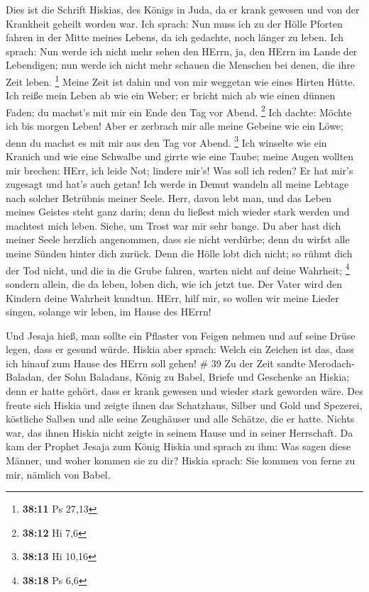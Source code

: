  Dies ist die Schrift Hiskias, des Königs in Juda, da er
krank gewesen und von der Krankheit geheilt worden war. 
Ich sprach: Nun muss ich zu der Hölle Pforten fahren in der Mitte meines
Lebens, da ich gedachte, noch länger zu leben.  Ich sprach:
Nun werde ich nicht mehr sehen den HErrn, ja, den HErrn im Lande der
Lebendigen; nun werde ich nicht mehr schauen die Menschen bei denen, die
ihre Zeit leben. \footnote{\textbf{38:11} Ps 27,13}  Meine
Zeit ist dahin und von mir weggetan wie eines Hirten Hütte. Ich reiße
mein Leben ab wie ein Weber; er bricht mich ab wie einen dünnen Faden;
du machst's mit mir ein Ende den Tag vor Abend. \footnote{\textbf{38:12}
  Hi 7,6}  Ich dachte: Möchte ich bis morgen Leben! Aber er
zerbrach mir alle meine Gebeine wie ein Löwe; denn du machst es mit mir
aus den Tag vor Abend. \footnote{\textbf{38:13} Hi 10,16} 
Ich winselte wie ein Kranich und wie eine Schwalbe und girrte wie eine
Taube; meine Augen wollten mir brechen: HErr, ich leide Not; lindere
mir's!  Was soll ich reden? Er hat mir's zugesagt und hat's
auch getan! Ich werde in Demut wandeln all meine Lebtage nach solcher
Betrübnis meiner Seele.  Herr, davon lebt man, und das
Leben meines Geistes steht ganz darin; denn du ließest mich wieder stark
werden und machtest mich leben.  Siehe, um Trost war mir
sehr bange. Du aber hast dich meiner Seele herzlich angenommen, dass sie
nicht verdürbe; denn du wirfst alle meine Sünden hinter dich zurück.
 Denn die Hölle lobt dich nicht; so rühmt dich der Tod
nicht, und die in die Grube fahren, warten nicht auf deine Wahrheit;
\footnote{\textbf{38:18} Ps 6,6}  sondern allein, die da
leben, loben dich, wie ich jetzt tue. Der Vater wird den Kindern deine
Wahrheit kundtun.  HErr, hilf mir, so wollen wir meine
Lieder singen, solange wir leben, im Hause des HErrn!

 Und Jesaja hieß, man sollte ein Pflaster von Feigen nehmen
und auf seine Drüse legen, dass er gesund würde.  Hiskia
aber sprach: Welch ein Zeichen ist das, dass ich hinauf zum Hause des
HErrn soll gehen! \# 39  Zu der Zeit sandte
Merodach-Baladan, der Sohn Baladans, König zu Babel, Briefe und
Geschenke an Hiskia; denn er hatte gehört, dass er krank gewesen und
wieder stark geworden wäre.  Des freute sich Hiskia und
zeigte ihnen das Schatzhaus, Silber und Gold und Spezerei, köstliche
Salben und alle seine Zeughäuser und alle Schätze, die er hatte. Nichts
war, das ihnen Hiskia nicht zeigte in seinem Hause und in seiner
Herrschaft.  Da kam der Prophet Jesaja zum König Hiskia und
sprach zu ihm: Was sagen diese Männer, und woher kommen sie zu dir?
Hiskia sprach: Sie kommen von ferne zu mir, nämlich von Babel.

